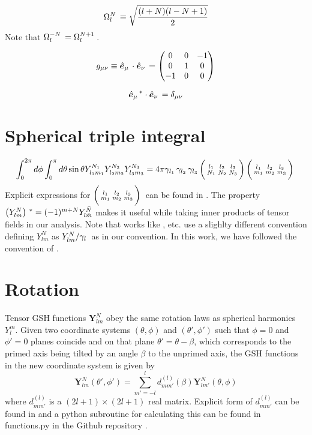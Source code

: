 \begin{equation}
\Omega_{l}^{N}\, \equiv \sqrt{\frac{(l+N)(l-N+1)}{2}}
\end{equation}
Note that $\Omega_{l}^{-N}\, = \Omega_{l}^{N+1}\,$.

\begin{equation}
g_{\mu\nu} \equiv \hat{\bm{e}}_{\mu}\,\cdot \hat{\bm{e}}_{\nu}\, = \left( \begin{matrix}
0 & 0 & -1 \\
0 & 1& 0  \\
-1 & 0 & 0
\end{matrix} \right)
\end{equation}

\begin{equation}
\hat{\bm{e}}_{\mu}\,^* \cdot \hat{\bm{e}}_{\nu}\, = \delta_{\mu\nu}
\end{equation}

\section{Spherical triple integral}
\begin{equation}
\int_0^{2\pi} d\phi \int_{0}^{\pi} d\theta\sin\theta Y_{l_1m_1}^{N_1}Y_{l_2m_2}^{N_2}Y_{l_3m_3}^{N_3} = 4\pi \gamma_{l_1}\,\gamma_{l_2}\,\gamma_{l_3}\, \bigg(\begin{smallmatrix} l_1 & l_2 & l_3 \\N_1 & N_2 & N_3 \end{smallmatrix}\bigg)\, \bigg(\begin{smallmatrix} l_1 & l_2 & l_3 \\m_1 & m_2 & m_3 \end{smallmatrix}\bigg)\,
\end{equation}
Explicit expressions for $\bigg(\begin{smallmatrix} l_1 & l_2 & l_3 \\m_1 & m_2 & m_3 \end{smallmatrix}\bigg)\,$ can be found in \cite{DT98}. The property $\left( Y_{lm}^{N} \right)\,^* = (-1)^{m+N}Y_{l\bar{m}}^{\bar{N}}$ makes it useful while taking inner products of tensor fields in our analysis.
Note that works like \cite{lavely92}, \cite{hanasoge17} etc. use a slighlty different convention defining $Y_{lm}^{N}$ as $Y_{lm}^{N}/\gamma_{l}\,$ as in our convention. In this work, we have followed the convention of \cite{DT98}.
\section{Rotation}

Tensor GSH functions $\mathbf{Y}_{lm}^N$ obey the same rotation laws as spherical harmonics $Y_{l}^{m}$. Given two coordinate systems $(\theta,\phi)$ and $(\theta',\phi')$ such that $\phi=0$ and $\phi'=0$ planes coincide and on that plane $\theta' = \theta-\beta$, which corresponds to the primed axis being tilted by an angle $\beta$ to the unprimed axis, the GSH functions in the new coordinate system is given by
\begin{equation}
\mathbf{Y}_{lm}^{N}(\theta',\phi') = \sum_{m'=-l}^{l} d_{mm'}^{(l)}(\beta) \mathbf{Y}_{lm'}^{N}(\theta,\phi)
\end{equation}
where $d_{mm'}^{(l)}$ is a $(2l+1)\times (2l+1)$ real matrix. Explicit form of $d^{(l)}_{mm'}$ can be found in \cite{DT98} and a python subroutine for calculating this can be found in functions.py in the Github repository \cite{main_repo}.

